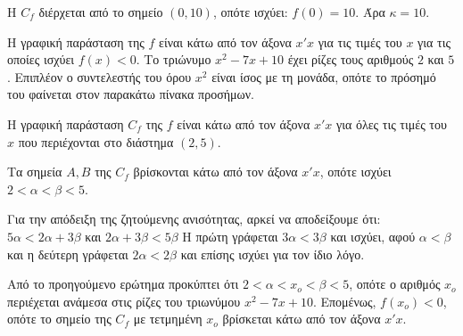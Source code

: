 
\begin{alist}
\item Η $C_f$ διέρχεται από το σημείο $(0, 10)$, οπότε ισχύει: $f(0) = 10$. Άρα $\kappa = 10$.

\item Η γραφική παράσταση της $f$ είναι κάτω από τον άξονα $x'x$ για τις τιμές του $x$ για τις οποίες ισχύει
$f(x) < 0$. Το τριώνυμο $x^2 - 7x + 10$ έχει ρίζες τους αριθμούς $2$ και $5$. Επιπλέον ο συντελεστής του
όρου $x^2$ είναι ίσος με τη μονάδα, οπότε το πρόσημό του φαίνεται στον παρακάτω πίνακα προσήμων.

\begin{center}
\end{center}

Η γραφική παράσταση $C_f$ της $f$ είναι κάτω από τον άξονα $x'x$ για όλες τις τιμές του $x$ που
περιέχονται στο διάστημα $(2, 5)$.

\item Τα σημεία $A, B$ της $C_f$ βρίσκονται κάτω από τον άξονα $x'x$, οπότε ισχύει $2 < \alpha < \beta < 5$.
\begin{rlist}
\item Για την απόδειξη της ζητούμενης ανισότητας, αρκεί να αποδείξουμε ότι:
$5\alpha < 2\alpha + 3\beta$ και $2\alpha + 3\beta < 5\beta$
Η πρώτη γράφεται $3\alpha < 3\beta$ και ισχύει, αφού $\alpha < \beta$ και η δεύτερη γράφεται $2\alpha < 2\beta$ και επίσης
ισχύει για τον ίδιο λόγο.

\item Από το προηγούμενο ερώτημα προκύπτει ότι $2 < \alpha < x_o < \beta < 5$, οπότε ο αριθμός $x_o$
περιέχεται ανάμεσα στις ρίζες του τριωνύμου $x^2 - 7x + 10$. Επομένως, $f(x_o) < 0$, οπότε το
σημείο της $C_f$ με τετμημένη $x_o$ βρίσκεται κάτω από τον άξονα $x'x$.
\end{rlist}
\end{alist}

